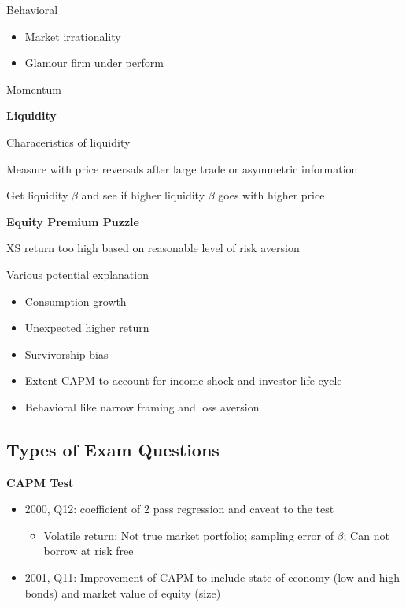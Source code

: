 \documentclass[]{book}
\providecommand{\tightlist}{%
  \setlength{\itemsep}{0pt}\setlength{\parskip}{0pt}}
\theoremstyle{definition}
\theoremstyle{definition}
\theoremstyle{remark}
\begin{document}
Behavioral

\begin{itemize}
\tightlist
\item
  Market irrationality
\item
  Glamour firm under perform
\end{itemize}

Momentum

\textbf{Liquidity}

Characeristics of liquidity

Measure with price reversals after large trade or asymmetric information

Get liquidity \(\beta\) and see if higher liquidity \(\beta\) goes with
higher price

\textbf{Equity Premium Puzzle}

XS return too high based on reasonable level of risk aversion

Various potential explanation

\begin{itemize}
\tightlist
\item
  Consumption growth
\item
  Unexpected higher return
\item
  Survivorship bias
\item
  Extent CAPM to account for income shock and investor life cycle
\item
  Behavioral like narrow framing and loss aversion
\end{itemize}

\subsection{Types of Exam Questions}\label{types-of-exam-questions-7}

\textbf{CAPM Test}

\begin{itemize}
\tightlist
\item
  2000, Q12: coefficient of 2 pass regression and caveat to the test

  \begin{itemize}
  \tightlist
  \item
    Volatile return; Not true market portfolio; sampling error of
    \(\beta\); Can not borrow at risk free
  \end{itemize}
\item
  2001, Q11: Improvement of CAPM to include state of economy (low and
  high bonds) and market value of equity (size)
\end{itemize}
\end{document}
